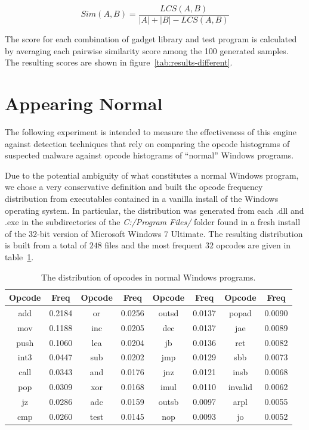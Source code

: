     $$Sim(A,B) = \frac{LCS(A,B)}{|A| + |B| - LCS(A,B)}$$

    The score for each combination of gadget library and test program is
    calculated by averaging each pairwise similarity score among the 100
    generated samples.  The resulting scores are shown in
    figure~\ref{tab:results-different}. 

\section{Appearing Normal}

    The following experiment is intended to measure the effectiveness of
    this engine against detection techniques that rely on comparing the
    opcode histograms of suspected malware against opcode histograms of
    ``normal'' Windows programs.

    Due to the potential ambiguity of what constitutes a normal Windows
    program, we chose a very conservative definition and built the opcode
    frequency distribution from executables contained in a vanilla install
    of the Windows operating system. In particular, the distribution was
    generated from each {.dll} and {.exe} in the subdirectories of the
    \emph{C:/Program Files/} folder found in a fresh install of the 32-bit
    version of Microsoft Windows 7 Ultimate. The resulting distribution is
    built from a total of $248$ files and the most frequent $32$ opcodes are
    given in table~\ref{tab:results-windows-dist}.

    \begin{table}
        \centering
        \begin{tabular}{|c|c||c|c||c|c||c|c|}
            \hline
            Opcode & Freq & Opcode & Freq & Opcode & Freq & Opcode & Freq \\
            \hline
            add & 0.2184 & or & 0.0256 & outsd & 0.0137 & popad & 0.0090 \\
            \hline
            mov & 0.1188 & inc & 0.0205 & dec & 0.0137 & jae & 0.0089 \\
            \hline
           push & 0.1060 & lea & 0.0204 & jb & 0.0136 & ret & 0.0082 \\
            \hline
           int3 & 0.0447 & sub & 0.0202 & jmp & 0.0129 & sbb & 0.0073 \\
            \hline
           call & 0.0343 & and & 0.0176 & jnz & 0.0121 & insb & 0.0068 \\
            \hline
            pop & 0.0309 & xor & 0.0168 & imul & 0.0110 & invalid & 0.0062 \\ 
            \hline
             jz & 0.0286 & adc & 0.0159 & outsb & 0.0097 & arpl & 0.0055 \\ 
            \hline
            cmp & 0.0260 & test & 0.0145 & nop & 0.0093 & jo & 0.0052 \\
            \hline
        \end{tabular}
        \caption{The distribution of opcodes in normal Windows programs.}
        \label{tab:results-windows-dist}
    \end{table}

